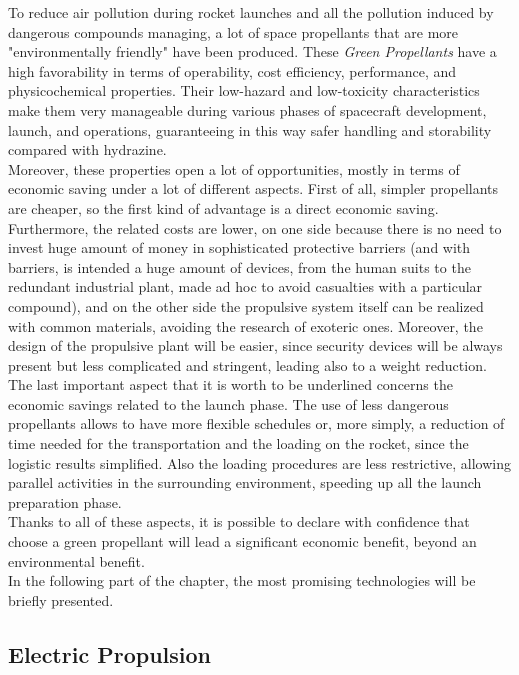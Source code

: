 \documentclass[a4paper]{report}
\begin{document}
To reduce air pollution during rocket launches and all the pollution induced by dangerous compounds managing, a lot of space propellants that are more "environmentally friendly" have been produced. These  \textit{Green Propellants} have a high favorability in terms of operability, cost efficiency, performance, and physicochemical properties. Their low-hazard and low-toxicity characteristics make them very manageable during various phases of spacecraft development, launch, and operations, guaranteeing in this way safer handling and storability compared with hydrazine. \\
Moreover, these properties open a lot of opportunities, mostly in terms of economic saving under a lot of different aspects. First of all, simpler propellants are cheaper, so the first kind of advantage is a direct economic saving. Furthermore, the related costs are lower, on one side because there is no need to invest huge amount of money in sophisticated protective barriers (and with barriers, is intended a huge amount of devices, from the human suits to the redundant industrial plant, made ad hoc to avoid casualties with a particular compound), and on the other side the propulsive system itself can be realized with common materials, avoiding the research of exoteric ones. Moreover, the design of the propulsive plant will be easier, since security devices will be always present but less complicated and stringent, leading also to a weight reduction. \\
The last important aspect that it is worth to be underlined concerns the economic savings related to the launch phase. The use of less dangerous propellants allows to have more flexible schedules or, more simply, a reduction of time needed for the transportation and the loading on the rocket, since the logistic results simplified. Also the loading procedures are less restrictive, allowing parallel activities in the surrounding environment, speeding up all the launch preparation phase.\\ 
Thanks to all of these aspects, it is possible to declare with confidence that choose a green propellant will lead a significant economic benefit, beyond an environmental benefit. \\ 
In the following part of the chapter, the most promising technologies will be briefly presented. \\

\subsection{Electric Propulsion}
\end{document}
